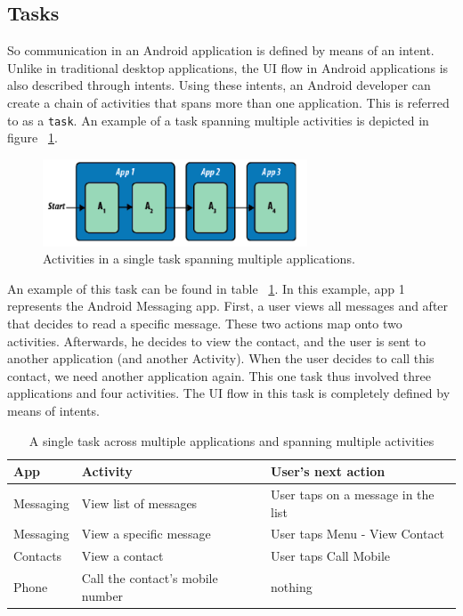 \subsection{Tasks}

So communication in an Android application is defined by means of an intent. Unlike in traditional desktop applications, the UI flow in Android applications is also described through intents. Using these intents, an Android developer can create a chain of activities that spans more than one application. This is referred to as a \texttt{task}. An example of a task spanning multiple activities is depicted in figure ~\ref{fig:android_task}.

\begin{figure}[h!]
\centering
\includegraphics[width=0.7\textwidth]{images/chap4_android_task.png}
\caption{Activities in a single task spanning multiple applications.}
\label{fig:android_task}
\end{figure}

An example of this task can be found in table ~\ref{tab:table1}. In this example, app 1 represents the Android Messaging app. First, a user views all messages and after that decides to read a specific message. These two actions map onto two activities. Afterwards, he decides to view the contact, and the user is sent to another application (and another Activity). When the user decides to call this contact, we need another application again. This one task thus involved three applications and four activities. The UI flow in this task is completely defined by means of intents.

\begin{table}[h!p!]
\caption{A single task across multiple applications and spanning multiple activities}
\begin{tabular}{| l l l |}
\hline
App & Activity & User's next action \\
\hline
Messaging & View list of messages & User taps on a message in the list \\
Messaging & View a specific message & User taps Menu - View Contact \\
Contacts & View a contact & User taps Call Mobile \\
Phone & Call the contact's mobile number & nothing \\
\hline  
\end{tabular}
\label{tab:table1}
\end{table}

